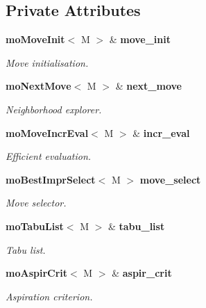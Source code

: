 \subsection*{Private Attributes}
\begin{CompactItemize}
\item 
{\bf mo\-Move\-Init}$<$ M $>$ \& {\bf move\_\-init}\label{classmo_t_s_move_loop_expl_6b23f99648902fb72ed17a4a6fa4e400}

\begin{CompactList}\small\item\em Move initialisation. \item\end{CompactList}\item 
{\bf mo\-Next\-Move}$<$ M $>$ \& {\bf next\_\-move}\label{classmo_t_s_move_loop_expl_aeeff6666d26ff5c67acd9c153a5ae49}

\begin{CompactList}\small\item\em Neighborhood explorer. \item\end{CompactList}\item 
{\bf mo\-Move\-Incr\-Eval}$<$ M $>$ \& {\bf incr\_\-eval}\label{classmo_t_s_move_loop_expl_ee4443fc8e45d840697619678628c26c}

\begin{CompactList}\small\item\em Efficient evaluation. \item\end{CompactList}\item 
{\bf mo\-Best\-Impr\-Select}$<$ M $>$ {\bf move\_\-select}\label{classmo_t_s_move_loop_expl_35a3f3035fb8df875c281d9838904bf1}

\begin{CompactList}\small\item\em Move selector. \item\end{CompactList}\item 
{\bf mo\-Tabu\-List}$<$ M $>$ \& {\bf tabu\_\-list}\label{classmo_t_s_move_loop_expl_0e5988a940ba218e87c53b7e56d79790}

\begin{CompactList}\small\item\em Tabu list. \item\end{CompactList}\item 
{\bf mo\-Aspir\-Crit}$<$ M $>$ \& {\bf aspir\_\-crit}\label{classmo_t_s_move_loop_expl_6786cf5422d17cbf872b07ae74ca6b0f}

\begin{CompactList}\small\item\em Aspiration criterion. \item\end{CompactList}\end{CompactItemize}


